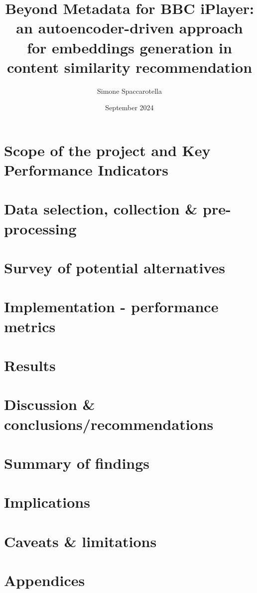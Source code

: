 \documentclass[12pt,a4paper]{article}
\begin{document}
\title{Beyond Metadata for BBC iPlayer:\\an autoencoder-driven approach for embeddings generation in content similarity recommendation}
\author{Simone Spaccarotella}
\date{September 2024}

\maketitle
\tableofcontents







\section{Scope of the project and Key Performance Indicators}

\section{Data selection, collection \& pre-processing}

\section{Survey of potential alternatives}

\section{Implementation - performance metrics}

\section{Results}

\section{Discussion \& conclusions/recommendations}

\section{Summary of findings}

\section{Implications}

\section{Caveats \& limitations}

\section{Appendices}



\end{document}
